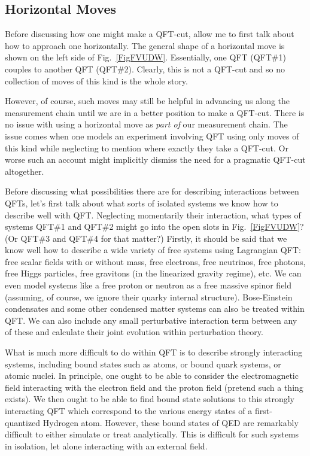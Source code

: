 \documentclass[prd,twocolumn,superscriptaddress,floatfix,amsmath,amssymb,amsfonts,nofootinbib]{revtex4-2}
\begin{document}
\subsection{Horizontal Moves}
Before discussing how one might make a QFT-cut, allow me to first talk about how to approach one horizontally. The general shape of a horizontal move is shown on the left side of Fig.~\ref{FigFVUDW}. Essentially, one QFT (QFT\#1) couples to another QFT (QFT\#2). Clearly, this is not a QFT-cut and so no collection of moves of this kind is the whole story.

However, of course, such moves may still be helpful in advancing us along the measurement chain until we are in a better position to make a QFT-cut. There is no issue with using a horizontal move as \textit{part of} our measurement chain. The issue comes when one models an experiment involving QFT using only moves of this kind while neglecting to mention where exactly they take a QFT-cut. Or worse such an account might implicitly dismiss the need for a pragmatic QFT-cut altogether. %

Before discussing what possibilities there are for describing interactions between QFTs, let's first talk about what sorts of isolated systems we know how to describe well with QFT. Neglecting momentarily their interaction, what types of systems QFT\#1 and QFT\#2 might go into the open slots in Fig.~\ref{FigFVUDW}? (Or QFT\#3 and QFT\#4 for that matter?) Firstly, it should be said that we know well how to describe a wide variety of free systems using Lagrangian QFT: free scalar fields with or without mass, free electrons, free neutrinos, free photons, free Higgs particles, free gravitons (in the linearized gravity regime), etc. We can even model systems like a free proton or neutron as a free massive spinor field (assuming, of course, we ignore their quarky internal structure). Bose-Einstein condensates and some other condensed matter systems can also be treated within QFT. We can also include any small perturbative interaction term between any of these and calculate their joint evolution within perturbation theory.

What is much more difficult to do within QFT is to describe strongly interacting systems, including bound states such as atoms, or bound quark systems, or atomic nuclei. In principle, one ought to be able to consider the electromagnetic field interacting with the electron field and the proton field (pretend such a thing exists). We then ought to be able to find bound state solutions to this strongly interacting QFT which correspond to the various energy states of a first-quantized Hydrogen atom. However, these bound states of QED are remarkably difficult to either simulate or treat analytically. This is difficult for such systems in isolation, let alone interacting with an external field.
\end{document}
